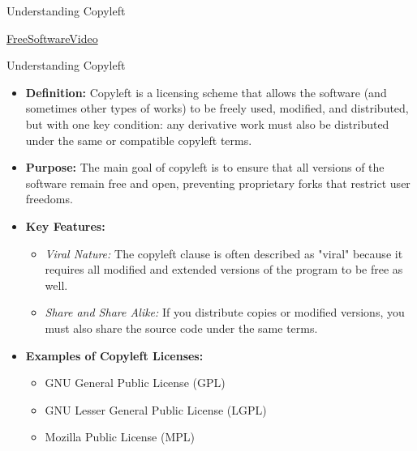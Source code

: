 \documentclass[10pt]{beamer}
\begin{document}
\begin{frame}{Understanding Copyleft}
\textcolor{myNewColorA}{\Huge{\centerline{\href{https://www.fsf.org/blogs/community/help-others-find-free-software-watch-and-share-escape-to-freedom}{FreeSoftwareVideo}}}}

\end{frame}

\begin{frame}{Understanding Copyleft}
  \begin{itemize}
      \item \textbf{Definition:} Copyleft is a licensing scheme that allows the software (and sometimes other types of works) to be freely used, modified, and distributed, but with one key condition: any derivative work must also be distributed under the same or compatible copyleft terms.
      
      \item \textbf{Purpose:} The main goal of copyleft is to ensure that all versions of the software remain free and open, preventing proprietary forks that restrict user freedoms.
      
      \item \textbf{Key Features:}
          \begin{itemize}
              \item \textit{Viral Nature:} The copyleft clause is often described as "viral" because it requires all modified and extended versions of the program to be free as well.
              \item \textit{Share and Share Alike:} If you distribute copies or modified versions, you must also share the source code under the same terms.
          \end{itemize}
      
      \item \textbf{Examples of Copyleft Licenses:}
          \begin{itemize}
              \item GNU General Public License (GPL)
              \item GNU Lesser General Public License (LGPL)
              \item Mozilla Public License (MPL)
          \end{itemize}
  \end{itemize}
\end{frame}
\end{document}
